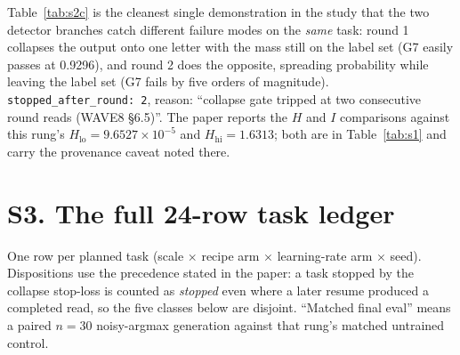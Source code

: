 \documentclass[11pt,a4paper]{article}
\begin{document}
\noindent Table~\ref{tab:s2c} is the cleanest single demonstration in the study that the two
detector branches catch different failure modes on the \emph{same} task: round 1 collapses the
output onto one letter with the mass still on the label set (G7 easily passes at 0.9296), and round
2 does the opposite, spreading probability while leaving the label set (G7 fails by five orders of
magnitude). \texttt{stopped\_after\_round: 2}, reason: ``collapse gate tripped at two consecutive
round reads (WAVE8 \S6.5)''. The paper reports the $H$ and $I$ comparisons against this rung's
$H_{\mathrm{lo}}{=}9.6527\times10^{-5}$ and $H_{\mathrm{hi}}{=}1.6313$; both are in
Table~\ref{tab:s1} and carry the provenance caveat noted there.


\section{S3. The full 24-row task ledger}

One row per planned task (scale $\times$ recipe arm $\times$ learning-rate arm $\times$ seed).
Dispositions use the precedence stated in the paper: a task stopped by the collapse stop-loss is
counted as \emph{stopped} even where a later resume produced a completed read, so the five classes
below are disjoint. ``Matched final eval'' means a paired $n{=}30$ noisy-argmax generation against
that rung's matched untrained control.
\end{document}
